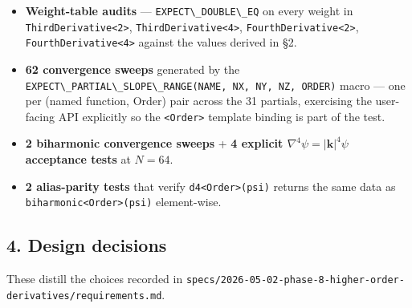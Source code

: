 \begin{itemize}
\tightlist
\item
  \textbf{Weight-table audits} ---
  \passthrough{\lstinline!EXPECT\_DOUBLE\_EQ!} on every weight in
  \passthrough{\lstinline!ThirdDerivative<2>!},
  \passthrough{\lstinline!ThirdDerivative<4>!},
  \passthrough{\lstinline!FourthDerivative<2>!},
  \passthrough{\lstinline!FourthDerivative<4>!} against the values
  derived in §2.
\item
  \textbf{62 convergence sweeps} generated by the
  \passthrough{\lstinline!EXPECT\_PARTIAL\_SLOPE\_RANGE(NAME, NX, NY, NZ, ORDER)!}
  macro --- one per (named function, Order) pair across the 31 partials,
  exercising the user-facing API explicitly so the
  \passthrough{\lstinline!<Order>!} template binding is part of the
  test.
\item
  \textbf{2 biharmonic convergence sweeps} + \textbf{4 explicit
  \(\nabla^4\psi = |\mathbf{k}|^4\psi\) acceptance tests} at \(N = 64\).
\item
  \textbf{2 alias-parity tests} that verify
  \passthrough{\lstinline!d4<Order>(psi)!} returns the same data as
  \passthrough{\lstinline!biharmonic<Order>(psi)!} element-wise.
\end{itemize}

\subsection{4. Design decisions}\label{design-decisions}

These distill the choices recorded in
\passthrough{\lstinline!specs/2026-05-02-phase-8-higher-order-derivatives/requirements.md!}.

